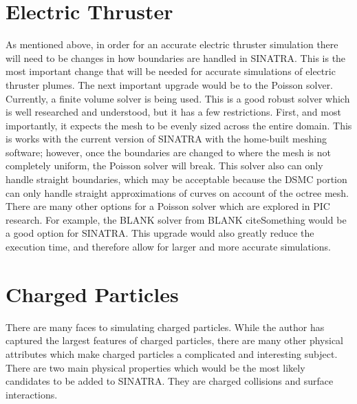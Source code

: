 \section{Electric Thruster}

As mentioned above, in order for an accurate electric thruster simulation there will need to be changes in how boundaries are handled in SINATRA. This is the most important change that will be needed for accurate simulations of electric thruster plumes. The next important upgrade would be to the Poisson solver. Currently, a finite volume solver is being used. This is a good robust solver which is well researched and understood, but it has a few restrictions. First, and most importantly, it expects the mesh to be evenly sized across the entire domain. This is works with the current version of SINATRA with the home-built meshing software; however, once the boundaries are changed to where the mesh is not completely uniform, the Poisson solver will break. This solver also can only handle straight boundaries, which may be acceptable because the DSMC portion can only handle straight approximations of curves on account of the octree mesh. There are many other options for a Poisson solver which are explored in PIC research. For example, the BLANK solver from BLANK cite{Something} would be a good option for SINATRA. This upgrade would also greatly reduce the execution time, and therefore allow for larger and more accurate simulations. \par

\section{Charged Particles}

There are many faces to simulating charged particles. While the author has captured the largest features of charged particles, there are many other physical attributes which make charged particles a complicated and interesting subject. There are two main physical properties which would be the most likely candidates to be added to SINATRA. They are charged collisions and surface interactions. \par

